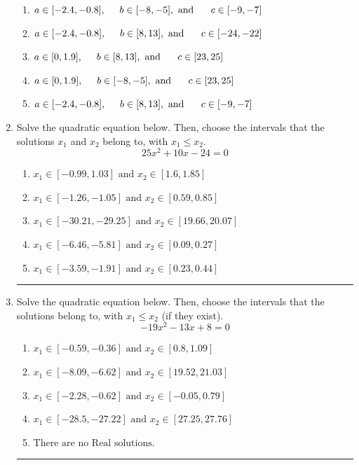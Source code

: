 \documentclass[14pt]{extbook}
\newcommand{\litem}[1]{\item#1\hspace*{-1cm}\rule{\textwidth}{0.4pt}}
\begin{document}
\begin{enumerate}
{\begin{center}
\end{center}
\begin{enumerate}[label=\Alph*.]
\item \( a \in [-2.4, -0.8], \hspace*{5mm} b \in [-8, -5], \text{ and } \hspace*{5mm} c \in [-9, -7] \)
\item \( a \in [-2.4, -0.8], \hspace*{5mm} b \in [8, 13], \text{ and } \hspace*{5mm} c \in [-24, -22] \)
\item \( a \in [0, 1.9], \hspace*{5mm} b \in [8, 13], \text{ and } \hspace*{5mm} c \in [23, 25] \)
\item \( a \in [0, 1.9], \hspace*{5mm} b \in [-8, -5], \text{ and } \hspace*{5mm} c \in [23, 25] \)
\item \( a \in [-2.4, -0.8], \hspace*{5mm} b \in [8, 13], \text{ and } \hspace*{5mm} c \in [-9, -7] \)

\end{enumerate} }
\litem{
Solve the quadratic equation below. Then, choose the intervals that the solutions $x_1$ and $x_2$ belong to, with $x_1 \leq x_2$.\[ 25x^{2} +10 x -24 = 0 \]\begin{enumerate}[label=\Alph*.]
\item \( x_1 \in [-0.99, 1.03] \text{ and } x_2 \in [1.6, 1.85] \)
\item \( x_1 \in [-1.26, -1.05] \text{ and } x_2 \in [0.59, 0.85] \)
\item \( x_1 \in [-30.21, -29.25] \text{ and } x_2 \in [19.66, 20.07] \)
\item \( x_1 \in [-6.46, -5.81] \text{ and } x_2 \in [0.09, 0.27] \)
\item \( x_1 \in [-3.59, -1.91] \text{ and } x_2 \in [0.23, 0.44] \)

\end{enumerate} }
\litem{
Solve the quadratic equation below. Then, choose the intervals that the solutions belong to, with $x_1 \leq x_2$ (if they exist).\[ -19x^{2} -13 x + 8 = 0 \]\begin{enumerate}[label=\Alph*.]
\item \( x_1 \in [-0.59, -0.36] \text{ and } x_2 \in [0.8, 1.09] \)
\item \( x_1 \in [-8.09, -6.62] \text{ and } x_2 \in [19.52, 21.03] \)
\item \( x_1 \in [-2.28, -0.62] \text{ and } x_2 \in [-0.05, 0.79] \)
\item \( x_1 \in [-28.5, -27.22] \text{ and } x_2 \in [27.25, 27.76] \)
\item \( \text{There are no Real solutions.} \)


\end{enumerate}}
\end{enumerate}
\end{document}
